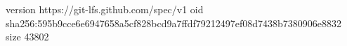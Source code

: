 version https://git-lfs.github.com/spec/v1
oid sha256:595b9cce6e6947658a5cf828bcd9a7ffdf79212497ef08d7438b7380906e8832
size 43802
